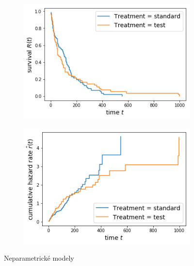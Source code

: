 \documentclass[10pt]{article}
\begin{document}
  \begin{figure}[htb!]
\centering 
    \begin{subfigure}{.4\linewidth}
    \centering
    \includegraphics[width=.99\textwidth]{Images/kmtreat.png}
    \label{fig:km1}
  \end{subfigure}%
    \begin{subfigure}{.4\linewidth}
    \centering
    \includegraphics[width=.99\textwidth]{Images/natreat.png}
    \label{fig:km1}
  \end{subfigure}%
  \caption{Neparametrické modely}\label{fig:tsdfsdfreat} 
  \end{figure}
\end{document}
